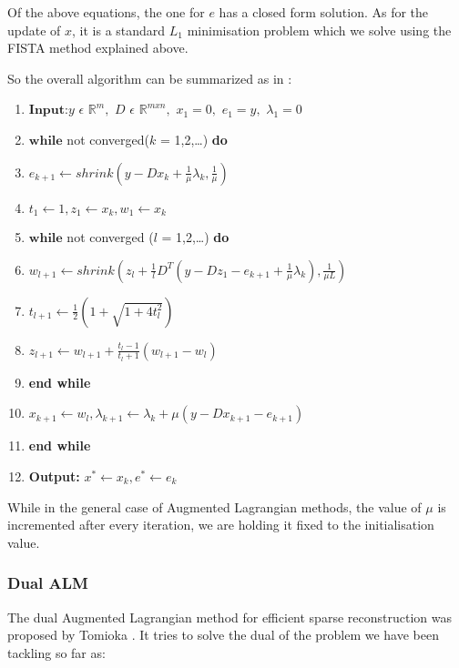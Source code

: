 \documentclass{article} %
\begin{document}
Of the above equations, the one for $e$ has a closed form solution. As for the update of $x$, it is a standard $L_1$ minimisation problem which we solve using the FISTA method explained above.

So the overall algorithm can be summarized as in \citep{yang2010fast}:

\begin{enumerate}
\item $\textbf{Input:}y$ $\epsilon$ $\mathbb{R}^m,$ $D$ $\epsilon$ $\mathbb{R}^{mxn},$ $x_1 = 0,$ $e_1 = y,$ $\lambda_1 = 0$
\item $\textbf{while}$ not converged($k$ = 1,2,\ldots) \textbf{do}
\item \hspace*{.4cm} $e_{k+1} \leftarrow shrink(y - Dx_k + \frac{1}{\mu}\lambda_k, \frac{1}{\mu})$
\item \hspace*{.4cm} $t_1 \leftarrow 1, z_1 \leftarrow x_k, w_1 \leftarrow x_k$
\item \hspace*{.4cm} $\textbf{while}$ not converged ($l$ = 1,2,\ldots) \textbf{do}
\item \hspace*{.8cm} $w_{l+1} \leftarrow shrink(z_l + \frac{1}{l}D^T(y - Dz_1 - e_{k+1} + \frac{1}{\mu}\lambda_k),\frac{1}{\mu L})$
\item \hspace*{.8cm} $t_{l+1} \leftarrow \frac{1}{2}(1 + \sqrt{1+4t_l^2})$
\item \hspace*{.8cm} $z_{l+1} \leftarrow w_{l+1} + \frac{t_l - 1}{t_l + 1}(w_{l+1} - w_l)$
\item \hspace*{.4cm} \textbf{end while}
\item \hspace*{.4cm} $x_{k+1} \leftarrow w_l, \lambda_{k+1} \leftarrow \lambda_k + \mu(y - Dx_{k+1} - e_{k+1})$
\item \textbf{end while}
\item \textbf{Output: } $x^{*} \leftarrow x_k, e^{*} \leftarrow e_k$
\end{enumerate}

While in the general case of Augmented Lagrangian methods, the value of $\mu$ is incremented after every iteration, we are holding it fixed to the initialisation value.

\vspace{-.2cm}
\subsubsection{Dual ALM}
\vspace{-.2cm}
The dual Augmented Lagrangian method for efficient sparse reconstruction was proposed by Tomioka  \citep{tomioka2009dual}. It tries to solve the dual of the problem we have been tackling so far as:
\end{document}
